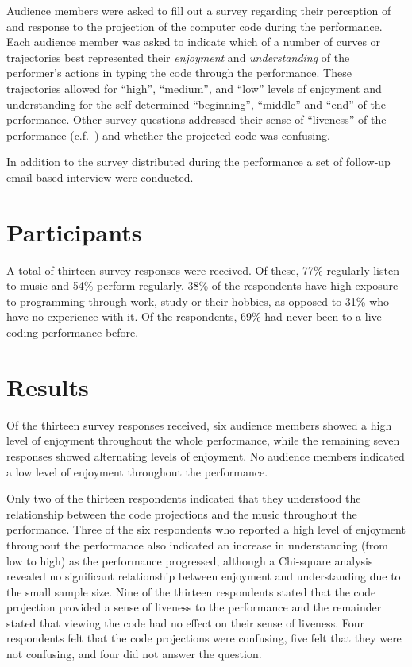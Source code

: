 Audience members were asked to fill out a survey regarding their perception of and response to the projection of the computer code during the
performance. Each audience member was asked to indicate which of a
number of curves or trajectories best represented their \emph{enjoyment}
and \emph{understanding} of the performer's actions in typing the code
through the performance. These trajectories allowed for ``high'',
``medium'', and ``low'' levels of enjoyment and understanding for the
self-determined ``beginning'', ``middle'' and ``end'' of the
performance. Other survey questions addressed their sense of
``liveness'' of the performance (c.f.~\cite{Auslander}) and whether
the projected code was confusing.

In addition to the survey distributed during the performance a set of follow-up email-based interview were conducted.

\section{Participants}

A total of thirteen survey responses were received. Of these, 77\% regularly listen to music and 54\% perform regularly. 38\% of the respondents have high exposure to programming through work, study or their hobbies, as opposed to 31\% who have no experience with it. Of the respondents, 69\% had never been to a live coding performance before.

\section{Results}

Of the thirteen survey responses received, six audience members showed
a high level of enjoyment throughout the whole performance, while the
remaining seven responses showed alternating levels of enjoyment. No
audience members indicated a low level of enjoyment throughout the
performance.

Only two of the thirteen respondents indicated that they understood
the relationship between the code projections and the music throughout
the performance. Three of the six respondents who reported a high
level of enjoyment throughout the performance also indicated an
increase in understanding (from low to high) as the performance
progressed, although a Chi-square analysis revealed no significant
relationship between enjoyment and understanding due to the small
sample size. Nine of the thirteen respondents stated that the code
projection provided a sense of liveness to the performance and the
remainder stated that viewing the code had no effect on their sense of
liveness. Four respondents felt that the code projections were
confusing, five felt that they were not confusing, and four did not
answer the question.

